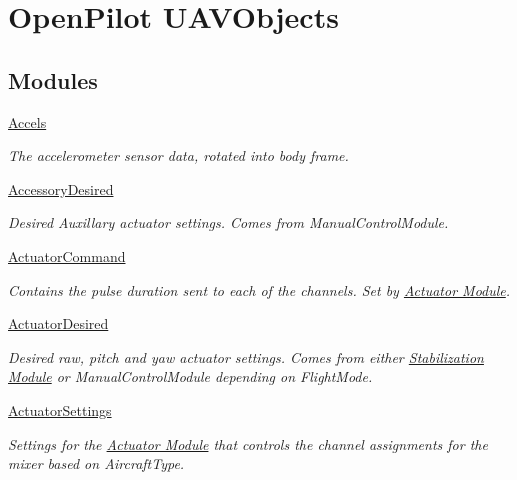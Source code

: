 \hypertarget{group___u_a_v_objects}{\section{\-Open\-Pilot \-U\-A\-V\-Objects}
\label{group___u_a_v_objects}
}
\subsection*{\-Modules}
\begin{DoxyCompactItemize}
\item 
\hyperlink{group___accels}{\-Accels}
\begin{DoxyCompactList}\small\item\em \-The accelerometer sensor data, rotated into body frame. \end{DoxyCompactList}\item 
\hyperlink{group___accessory_desired}{\-Accessory\-Desired}
\begin{DoxyCompactList}\small\item\em \-Desired \-Auxillary actuator settings. \-Comes from \-Manual\-Control\-Module. \end{DoxyCompactList}\item 
\hyperlink{group___actuator_command}{\-Actuator\-Command}
\begin{DoxyCompactList}\small\item\em \-Contains the pulse duration sent to each of the channels. \-Set by \hyperlink{group___actuator_module}{\-Actuator \-Module}. \end{DoxyCompactList}\item 
\hyperlink{group___actuator_desired}{\-Actuator\-Desired}
\begin{DoxyCompactList}\small\item\em \-Desired raw, pitch and yaw actuator settings. \-Comes from either \hyperlink{group___stabilization_module}{\-Stabilization \-Module} or \-Manual\-Control\-Module depending on \-Flight\-Mode. \end{DoxyCompactList}\item 
\hyperlink{group___actuator_settings}{\-Actuator\-Settings}
\begin{DoxyCompactList}\small\item\em \-Settings for the \hyperlink{group___actuator_module}{\-Actuator \-Module} that controls the channel assignments for the mixer based on \-Aircraft\-Type. \end{DoxyCompactList}\item 

\end{DoxyCompactItemize}
